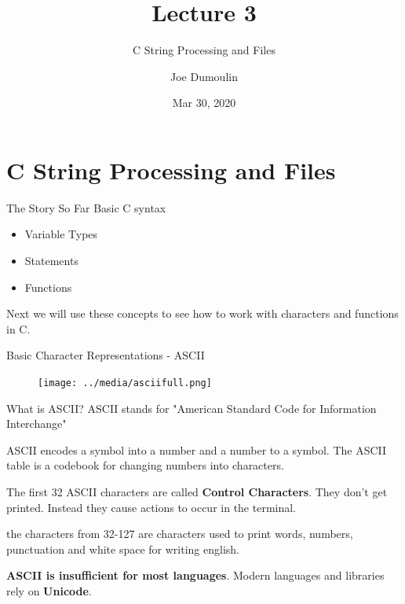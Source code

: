 \documentclass[10pt]{beamer}
\title{Lecture 3}
\subtitle{C String Processing and Files}
\date{Mar 30, 2020}
\author{Joe Dumoulin}
\institute{Eastern Washington University}
\begin{document}
\maketitle
\section{C String Processing and Files} 



\begin{frame}[fragile]{The Story So Far}
Basic C syntax

\begin{itemize}

\item Variable Types
\item Statements
\item Functions

\end{itemize}

Next we will use these concepts to see how to work with characters and functions in C.

\end{frame}
\begin{frame}[fragile]{Basic Character Representations - ASCII}

\begin{figure}[htp]
    \centering
    \texttt{[image: ../media/asciifull.png]}
    \label{fig:ASCII}
\end{figure}


\end{frame}
\begin{frame}[fragile]{What is ASCII?}
ASCII stands for "American Standard Code for Information Interchange"

ASCII encodes a symbol into a number and a number to a symbol.  The ASCII table is a codebook for changing numbers into characters.

The first 32 ASCII characters are called \textbf{Control Characters}.  They don't get printed.  Instead they cause actions to occur in the terminal.

the characters from  32-127 are characters used to print words, numbers, punctuation and white space for writing english.

\textbf{ASCII is insufficient for most languages}.  Modern languages and libraries rely on \textbf{Unicode}.


\end{frame}
\end{document}
